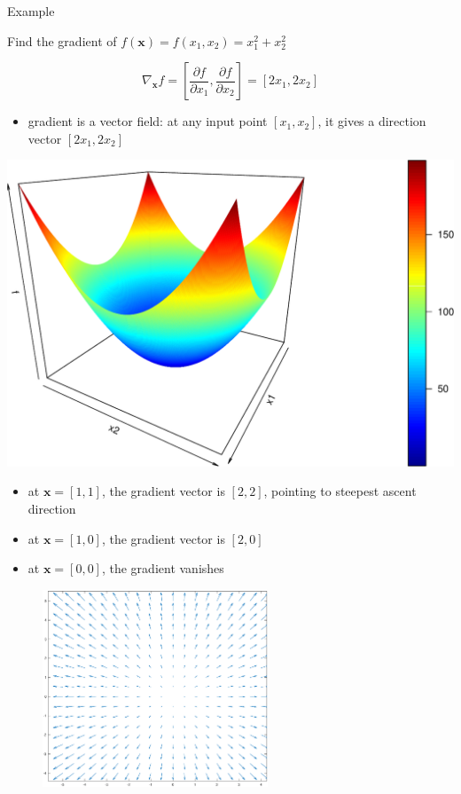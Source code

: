 \documentclass[ignorenonframetext,]{beamer}
\providecommand{\tightlist}{%
  \setlength{\itemsep}{0pt}\setlength{\parskip}{0pt}}
\newcommand{\vv}[1]{\boldsymbol{#1}}
\begin{document}
\begin{frame}{Example}
\protect\hypertarget{example-4}{}

Find the gradient of \(f(\vv{x}) = f(x_1, x_2) = x_1^2 +x_2^2\)

\[\nabla_{\vv{x}}f = \left [\frac{\partial f}{\partial x_1}, \frac{\partial f}{\partial x_2}\right ] = [2x_1, 2x_2]\]

\begin{itemize}
\tightlist
\item
  gradient is a vector field: at any input point \([x_1, x_2]\), it
  gives a direction vector \([2x_1, 2x_2]\)
\end{itemize}

\begin{center}\includegraphics[width=0.6\linewidth]{math4ml_files/figure-beamer/unnamed-chunk-12-1} \end{center}

\end{frame}

\begin{frame}{}
\protect\hypertarget{section-6}{}

\begin{itemize}
\tightlist
\item
  at \(\vv{x} = [1,1]\), the gradient vector is \([2,2]\), pointing to
  steepest ascent direction
\item
  at \(\vv{x} = [1,0]\), the gradient vector is \([2,0]\)
\item
  at \(\vv{x} = [0,0]\), the gradient vanishes
\end{itemize}

\begin{figure}
    \centering
    \includegraphics[width = 0.6\textwidth]{./gradvecfield.eps}
\end{figure}

\end{frame}
\end{document}
